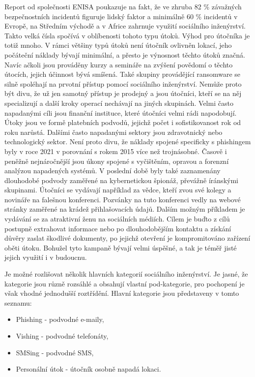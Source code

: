 Report od společnosti \ac{ENISA} poukazuje na fakt, že ve zhruba 82 \% závažných bezpečnostních incidentů figuruje lidský faktor a minimálně 60 \% incidentů v Evropě, na Středním východě a v Africe zahrnuje využití sociálního inženýrství.
Takto velká čísla spočívá v oblíbenosti tohoto typu útoků.
Výhod pro útočníka je totiž mnoho.
V rámci většiny typů útoků není útočník ovlivněn lokací, jeho počáteční náklady bývají minimální, a přesto je výnosnost těchto útoků značná.
Navíc ačkoli jsou prováděny kurzy a semináře na zvýšení povědomí o těchto útocích, jejich účinnost bývá smíšená.
Také skupiny provádějící ransomware se silně spoléhají na prvotní přístup pomocí sociálního inženýrství.
Nemůže proto být divu, že už jen samotný přístup je prodejný a jsou útočníci, kteří se na něj specializují a další kroky operací nechávají na jiných skupinách.
Velmi často napadanými cíli jsou finanční instituce, které útočníci velmi rádi napodobují.
Útoky jsou ve formě platebních podvodů, jejichž počet i sofistikovanost rok od roku narůstá.
Dalšími často napadanými sektory jsou zdravotnický nebo technologický sektor.
Není proto divu, že náklady spojené specificky s phishingem byly v roce 2021 v porovnání s rokem 2015 více než trojnásobné.
Časově i peněžně nejnáročnější jsou úkony spojené s vyčištěním, opravou a forenzní analýzou napadených systémů.
V poslední době byly také zaznamenány dlouhodobé podvody zaměřené na kybernetickou špionáž, převážně íránskými skupinami.
Útočníci se vydávají například za vědce, kteří zvou své kolegy a novináře na falešnou konferenci.
Pozvánky na tuto konferenci vedly na  webové stránky zaměřené na krádež přihlašovacích údajů.
Dalším možným příkladem je vydávání se za atraktivní ženu na sociálních médiích.
Cílem je buďto z cílů postupně extrahovat informace nebo po dlouhodobějším kontaktu a získání důvěry zaslat škodlivé dokumenty, po jejichž otevření je kompromitováno zařízení oběti útoku.
Bohužel tyto kampaně bývají velmi úspěšné, a tak je téměř jisté jejich využití i v budoucnu.\cite{Enisa_thread_landscape}

Je možné rozlišovat několik hlavních kategorií sociálního inženýrství.
Je jasné, že kategorie jsou různě rozsáhlé a obsahují vlastní pod-kategorie, pro pochopení je však vhodné jednodušší roztřídění.
Hlavní kategorie jsou představeny v tomto seznamu:
\begin{itemize}
	\item Phishing - podvodné e-maily,
	\item Vishing - podvodné telefonáty,
	\item SMSing - podvodné \ac{SMS},
	\item Personální útok - útočník osobně napadá lokaci.
\end{itemize}\cite{Enisa_thread_landscape, moje_bakalarka}%


